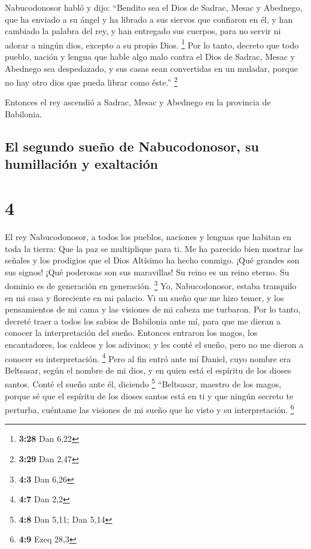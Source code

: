  Nabucodonosor habló y dijo: ``Bendito sea el Dios de
Sadrac, Mesac y Abednego, que ha enviado a su ángel y ha librado a sus
siervos que confiaron en él, y han cambiado la palabra del rey, y han
entregado sus cuerpos, para no servir ni adorar a ningún dios, excepto a
su propio Dios. \footnote{\textbf{3:28} Dan 6,22}  Por lo
tanto, decreto que todo pueblo, nación y lengua que hable algo malo
contra el Dios de Sadrac, Mesac y Abednego sea despedazado, y sus casas
sean convertidas en un muladar, porque no hay otro dios que pueda librar
como éste.'' \footnote{\textbf{3:29} Dan 2,47}

 Entonces el rey ascendió a Sadrac, Mesac y Abednego en
la provincia de Babilonia.

\hypertarget{el-segundo-sueuxf1o-de-nabucodonosor-su-humillaciuxf3n-y-exaltaciuxf3n}{%
\subsection{El segundo sueño de Nabucodonosor, su humillación y
exaltación}\label{el-segundo-sueuxf1o-de-nabucodonosor-su-humillaciuxf3n-y-exaltaciuxf3n}}

\hypertarget{section-3}{%
\section{4}\label{section-3}}

 El rey Nabucodonosor, a todos los pueblos, naciones y
lenguas que habitan en toda la tierra: Que la paz se multiplique para
ti.  Me ha parecido bien mostrar las señales y los
prodigios que el Dios Altísimo ha hecho conmigo.  ¡Qué
grandes son sus signos! ¡Qué poderosas son sus maravillas! Su reino es
un reino eterno. Su dominio es de generación en generación. \footnote{\textbf{4:3}
  Dan 6,26}  Yo, Nabucodonosor, estaba tranquilo en mi
casa y floreciente en mi palacio.  Vi un sueño que me hizo
temer, y los pensamientos de mi cama y las visiones de mi cabeza me
turbaron.  Por lo tanto, decreté traer a todos los sabios
de Babilonia ante mí, para que me dieran a conocer la interpretación del
sueño.  Entonces entraron los magos, los encantadores, los
caldeos y los adivinos; y les conté el sueño, pero no me dieron a
conocer su interpretación. \footnote{\textbf{4:7} Dan 2,2}
 Pero al fin entró ante mí Daniel, cuyo nombre era
Beltsasar, según el nombre de mi dios, y en quien está el espíritu de
los dioses santos. Conté el sueño ante él, diciendo \footnote{\textbf{4:8}
  Dan 5,11; Dan 5,14}  ``Beltsasar, maestro de los magos,
porque sé que el espíritu de los dioses santos está en ti y que ningún
secreto te perturba, cuéntame las visiones de mi sueño que he visto y su
interpretación. \footnote{\textbf{4:9} Ezeq 28,3}

